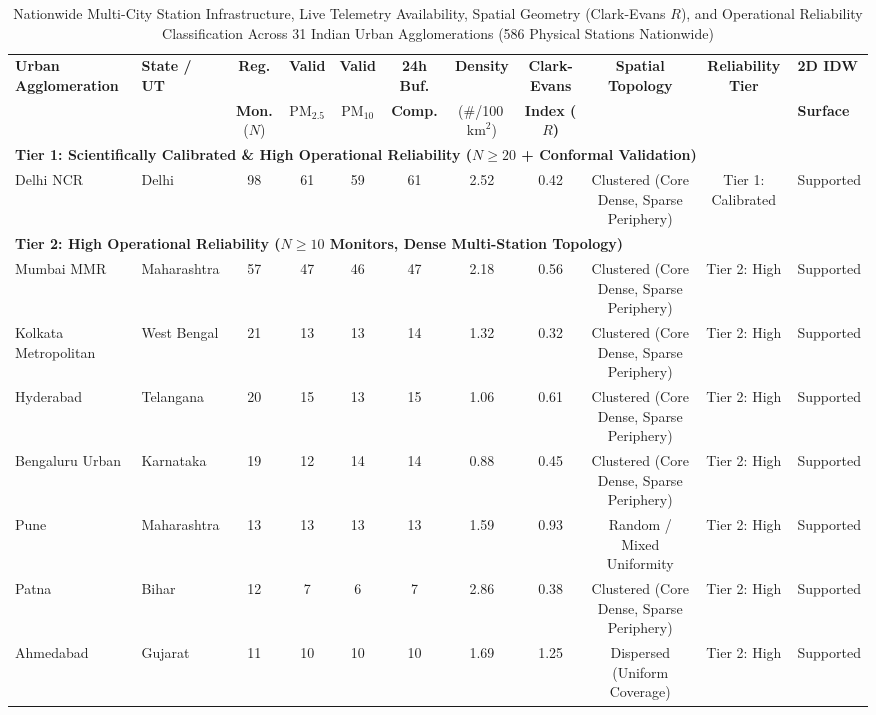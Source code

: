 \begin{table}[t]
\caption{Nationwide Multi-City Station Infrastructure, Live Telemetry Availability, Spatial Geometry (Clark-Evans $R$), and Operational Reliability Classification Across 31 Indian Urban Agglomerations (586 Physical Stations Nationwide)}
\label{tab:multicity_coverage}
\centering
\scriptsize
\begin{tabular}{llccccccccl}
\toprule
\textbf{Urban Agglomeration} & \textbf{State / UT} & \textbf{Reg.} & \textbf{Valid} & \textbf{Valid} & \textbf{24h Buf.} & \textbf{Density} & \textbf{Clark-Evans} & \textbf{Spatial Topology} & \textbf{Reliability Tier} & \textbf{2D IDW} \\
& & \textbf{Mon.} ($N$) & \textbf{$\text{PM}_{2.5}$} & \textbf{$\text{PM}_{10}$} & \textbf{Comp.} & (\#/100\,$\text{km}^2$) & \textbf{Index ($R$)} & & & \textbf{Surface} \\
\midrule
\multicolumn{11}{l}{\textbf{Tier 1: Scientifically Calibrated \& High Operational Reliability ($N \ge 20$ + Conformal Validation)}} \\
Delhi NCR & Delhi & 98 & 61 & 59 & 61 & 2.52 & 0.42 & Clustered (Core Dense, Sparse Periphery) & Tier 1: Calibrated & Supported \\
\midrule
\multicolumn{11}{l}{\textbf{Tier 2: High Operational Reliability ($N \ge 10$ Monitors, Dense Multi-Station Topology)}} \\
Mumbai MMR & Maharashtra & 57 & 47 & 46 & 47 & 2.18 & 0.56 & Clustered (Core Dense, Sparse Periphery) & Tier 2: High & Supported \\
Kolkata Metropolitan & West Bengal & 21 & 13 & 13 & 14 & 1.32 & 0.32 & Clustered (Core Dense, Sparse Periphery) & Tier 2: High & Supported \\
Hyderabad & Telangana & 20 & 15 & 13 & 15 & 1.06 & 0.61 & Clustered (Core Dense, Sparse Periphery) & Tier 2: High & Supported \\
Bengaluru Urban & Karnataka & 19 & 12 & 14 & 14 & 0.88 & 0.45 & Clustered (Core Dense, Sparse Periphery) & Tier 2: High & Supported \\
Pune & Maharashtra & 13 & 13 & 13 & 13 & 1.59 & 0.93 & Random / Mixed Uniformity & Tier 2: High & Supported \\
Patna & Bihar & 12 & 7 & 6 & 7 & 2.86 & 0.38 & Clustered (Core Dense, Sparse Periphery) & Tier 2: High & Supported \\
Ahmedabad & Gujarat & 11 & 10 & 10 & 10 & 1.69 & 1.25 & Dispersed (Uniform Coverage) & Tier 2: High & Supported \\

\end{tabular}
\end{table}
